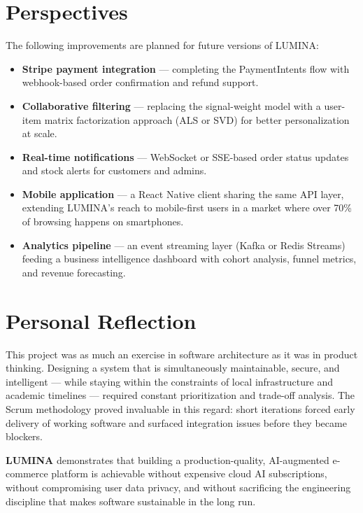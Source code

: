 \section*{Perspectives}

The following improvements are planned for future versions of LUMINA:

\begin{itemize}
  \item \textbf{Stripe payment integration} --- completing the PaymentIntents
        flow with webhook-based order confirmation and refund support.
  \item \textbf{Collaborative filtering} --- replacing the signal-weight model
        with a user-item matrix factorization approach (ALS or SVD)
        for better personalization at scale.
  \item \textbf{Real-time notifications} --- WebSocket or SSE-based order status
        updates and stock alerts for customers and admins.
  \item \textbf{Mobile application} --- a React Native client sharing the
        same API layer, extending LUMINA's reach to mobile-first users
        in a market where over 70\% of browsing happens on smartphones.
  \item \textbf{Analytics pipeline} --- an event streaming layer (Kafka or
        Redis Streams) feeding a business intelligence dashboard with
        cohort analysis, funnel metrics, and revenue forecasting.
\end{itemize}

\section*{Personal Reflection}

This project was as much an exercise in software architecture as it was in
product thinking. Designing a system that is simultaneously maintainable,
secure, and intelligent --- while staying within the constraints of local
infrastructure and academic timelines --- required constant prioritization
and trade-off analysis.
The Scrum methodology proved invaluable in this regard: short iterations
forced early delivery of working software and surfaced integration issues
before they became blockers.

\vspace{1em}
\noindent
\textbf{LUMINA} demonstrates that building a production-quality, AI-augmented
e-commerce platform is achievable without expensive cloud AI subscriptions,
without compromising user data privacy, and without sacrificing the
engineering discipline that makes software sustainable in the long run.
